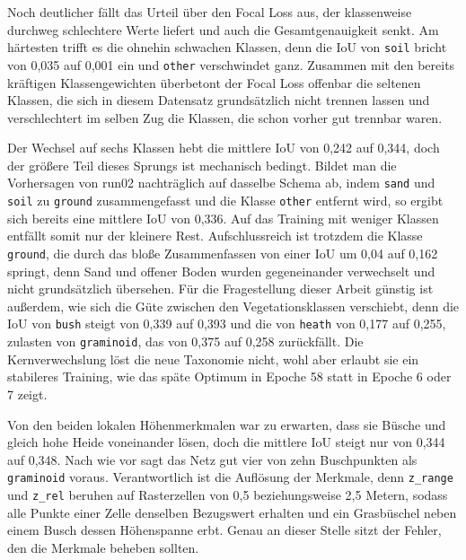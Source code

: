 Noch deutlicher fällt das Urteil über den Focal Loss aus, der klassenweise durchweg schlechtere Werte liefert und auch die Gesamtgenauigkeit senkt. Am härtesten trifft es die ohnehin schwachen Klassen, denn die IoU von \texttt{soil} bricht von 0,035 auf 0,001 ein und \texttt{other} verschwindet ganz. Zusammen mit den bereits kräftigen Klassengewichten überbetont der Focal Loss offenbar die seltenen Klassen, die sich in diesem Datensatz grundsätzlich nicht trennen lassen und verschlechtert im selben Zug die Klassen, die schon vorher gut trennbar waren.

Der Wechsel auf sechs Klassen hebt die mittlere IoU von 0,242 auf 0,344, doch der größere Teil dieses Sprungs ist mechanisch bedingt. Bildet man die Vorhersagen von run02 nachträglich auf dasselbe Schema ab, indem \texttt{sand} und \texttt{soil} zu \texttt{ground} zusammengefasst und die Klasse \texttt{other} entfernt wird, so ergibt sich bereits eine mittlere IoU von 0,336. Auf das Training mit weniger Klassen entfällt somit nur der kleinere Rest. Aufschlussreich ist trotzdem die Klasse \texttt{ground}, die durch das bloße Zusammenfassen von einer IoU um 0,04 auf 0,162 springt, denn Sand und offener Boden wurden gegeneinander verwechselt und nicht grundsätzlich übersehen. Für die Fragestellung dieser Arbeit günstig ist außerdem, wie sich die Güte zwischen den Vegetationsklassen verschiebt, denn die IoU von \texttt{bush} steigt von 0,339 auf 0,393 und die von \texttt{heath} von 0,177 auf 0,255, zulasten von \texttt{graminoid}, das von 0,375 auf 0,258 zurückfällt. Die Kernverwechslung löst die neue Taxonomie nicht, wohl aber erlaubt sie ein stabileres Training, wie das späte Optimum in Epoche 58 statt in Epoche 6 oder 7 zeigt.

Von den beiden lokalen Höhenmerkmalen war zu erwarten, dass sie Büsche und gleich hohe Heide voneinander lösen, doch die mittlere IoU steigt nur von 0,344 auf 0,348. Nach wie vor sagt das Netz gut vier von zehn Buschpunkten als \texttt{graminoid} voraus. Verantwortlich ist die Auflösung der Merkmale, denn \texttt{z\_range} und \texttt{z\_rel} beruhen auf Rasterzellen von 0,5 beziehungsweise 2,5 Metern, sodass alle Punkte einer Zelle denselben Bezugswert erhalten und ein Grasbüschel neben einem Busch dessen Höhenspanne erbt. Genau an dieser Stelle sitzt der Fehler, den die Merkmale beheben sollten.

